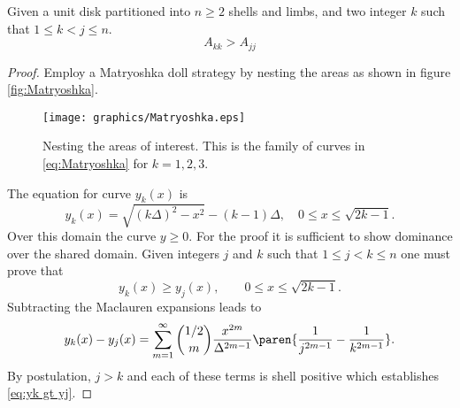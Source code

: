 \begin{myTheorem}  
Given a unit disk partitioned into $n\ge2$ shells and limbs, and two integer $k$ such that $1\le k < j \le n$.
\begin{equation}
  A_{kk} > A_{jj}
\end{equation}
\label{eq:limb dom}
\end{myTheorem}  %
\begin{proof}  %
Employ a Matryoshka doll strategy by nesting the areas as shown in figure \eqref{fig:Matryoshka}.
\begin{figure}[htbp] %
   \centering
   \texttt{[image: graphics/Matryoshka.eps]} 
   \caption{Nesting the areas of interest. This is the family of curves in \eqref{eq:Matryoshka} for $k=1,2,3$.}
   \label{fig:Matryoshka}
\end{figure}
The equation for curve $y_{k}(x)$ is
  \begin{equation}
    y_{k}(x) = \sqrt{(k \Delta)^{2} - x^{2}} - (k-1)\Delta, \quad 0\le x \le \sqrt{2k-1} .
    \label{eq:Matryoshka}
  \end{equation}
Over this domain the curve $y\ge0$. For the proof it is sufficient to show dominance over the shared domain. Given integers $j$ and $k$ such that $1\le j < k \le n$ one must prove that
  \begin{equation}
    y_{k}(x) \ge y_{j}(x), \qquad 0\le x \le \sqrt{2k-1} .
    \label{eq:yk gt yj}
  \end{equation}
Subtracting the Maclauren expansions leads to
  \begin{equation}
    y_{k}(x) - y_{j}(x) 
      = \sum_{m=1}^{\infty} \binom{1/2}{m} \frac{x^{2m}}{\Delta^{2m-1}}\paren{\frac{1}{j^{2m-1}}-\frac{1}{k^{2m-1}}} .
   \end{equation}
By postulation, $j>k$ and each of these terms is shell positive which establishes \eqref{eq:yk gt yj}.
\end{proof}  %

\endinput %